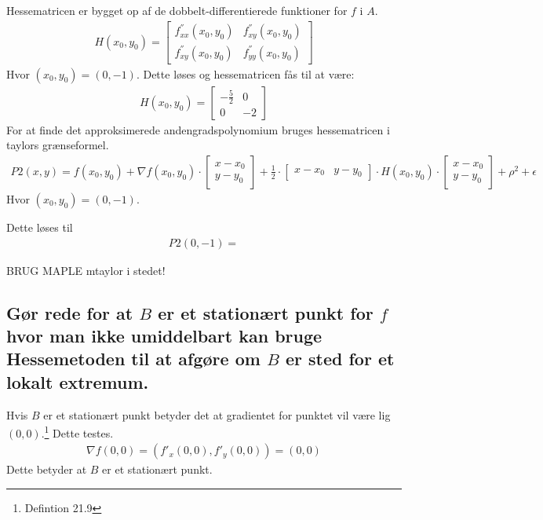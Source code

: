 Hessematricen er bygget op af de dobbelt-differentierede funktioner for $f$ i $A$. 
\begin{align}
    H(x_0,y_0)= 
    \left[
    \begin{array}{cc}
        f^{''}_{xx}(x_0,y_0) & f^{''}_{xy}(x_0,y_0)\\f^{''}_{xy}(x_0,y_0) & f^{''}_{yy}(x_0,y_0)
    \end{array}
\right] 
\end{align}
Hvor $(x_0,y_0)=(0,-1)$.
Dette løses og hessematricen fås til at være:
\begin{align}
    H(x_0,y_0)= 
    \left[
    \begin{array}{cc}
        -\frac{5}{2} & 0\\0 & -2
    \end{array}
\right] 
\end{align}
For at finde det approksimerede andengradspolynomium bruges hessematricen i taylors grænseformel.
\begin{align*}
    P2(x,y)=f(x_0,y_0)+\nabla f(x_0,y_0) \cdot \left[ \begin{array}{c}x-x_0\\ y-y_0 \end{array}\right] + \frac12 \cdot \left[ \begin{array}{cc}x-x_0& y-y_0 \end{array}\right] \cdot H(x_0,y_0) \cdot \left[ \begin{array}{c}x-x_0\\ y-y_0 \end{array}\right]  + \rho ^2 + \epsilon
\end{align*}
Hvor $(x_0,y_0)=(0,-1)$.

Dette løses til
\begin{align}
    P2(0,-1) = 
\end{align}

BRUG MAPLE mtaylor i stedet!



\subsection{Gør rede for at $B$ er et stationært punkt for $f$ hvor man ikke umiddelbart kan bruge Hessemetoden til at afgøre om $B$ er sted for et lokalt extremum.}

Hvis $B$ er et stationært punkt betyder det at gradientet for punktet vil være lig $(0,0)$.\footnote{Defintion 21.9} Dette testes.
\begin{align}
    \nabla f(0,0) = \left(f'_x(0,0),f'_y(0,0)\right) = (0,0)
\end{align}
Dette betyder at $B$ er et stationært punkt.

